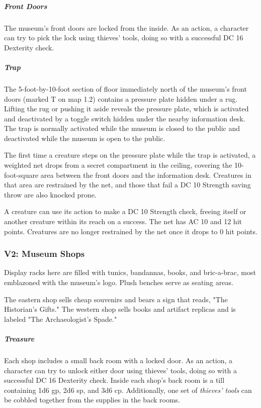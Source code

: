\documentclass[10pt,a4paper,twoside,bg=print,twocolumn,openany,nodeprecatedcode]{dndbook}
\begin{document}
\subparagraph{Front Doors}
The museum's front doors are locked from the inside. As an action, a character can try to pick the lock using thieves' tools, doing so with a successful DC 16 Dexterity check.

\subparagraph{Trap}
The 5-foot-by-10-foot section of floor immediately north of the museum's front doors (marked T on map 1.2) contains a pressure plate hidden under a rug. Lifting the rug or pushing it aside reveals the pressure plate, which is activated and deactivated by a toggle switch hidden under the nearby information desk. The trap is normally activated while the museum is closed to the public and deactivated while the museum is open to the public.

The first time a creature steps on the pressure plate while the trap is activated, a weighted net drops from a secret compartment in the ceiling, covering the 10-foot-square area between the front doors and the information desk. Creatures in that area are restrained by the net, and those that fail a DC 10 Strength saving throw are also knocked prone.

A creature can use its action to make a DC 10 Strength check, freeing itself or another creature within its reach on a success. The net has AC 10 and 12 hit points. Creatures are no longer restrained by the net once it drops to 0 hit points.

\subsubsection{V2: Museum Shops}
\begin{DndReadAloud}{}
Display racks here are filled with tunics, bandannas, books, and bric-a-brac, most emblazoned with the museum's logo. Plush benches serve as seating areas.

\end{DndReadAloud}

The eastern shop sells cheap souvenirs and bears a sign that reads, "The Historian's Gifts." The western shop sells books and artifact replicas and is labeled "The Archaeologist's Spade."

\subparagraph{Treasure}
Each shop includes a small back room with a locked door. As an action, a character can try to unlock either door using thieves' tools, doing so with a successful DC 16 Dexterity check. Inside each shop's back room is a till containing 1d6 gp, 2d6 sp, and 3d6 cp. Additionally, one set of \textit{thieves' tools} can be cobbled together from the supplies in the back rooms.
\end{document}
